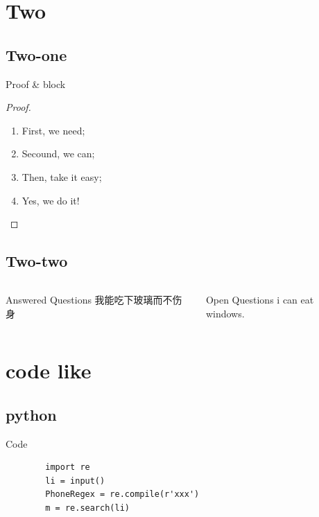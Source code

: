 \documentclass{ctexbeamer}
\begin{document}
  \section{Two}
    \subsection{Two-one}
    \begin{frame}{Proof & block}
      \begin{proof}
          \begin{enumerate}
              \item<1-> First, we need;
              \item<2-> Secound, we can;
              \item<3-> Then, take it easy;
              \item<1-> Yes, we do it!
          \end{enumerate}
      \end{proof}  
    \end{frame}
    
    \subsection{Two-two}
    \begin{frame}
        \begin{columns}[t]
            \begin{block}{Answered Questions}
                我能吃下玻璃而不伤身
            \end{block}
    
            \begin{block}{Open Questions}
                i can eat windows.
            \end{block}
        \end{columns}
    \end{frame}
  
  \section{code like}
  \subsection{python}
  \begin{frame}[fragile]{Code}
      \begin{lstlisting}
        import re
        li = input()
        PhoneRegex = re.compile(r'xxx')
        m = re.search(li)
      \end{lstlisting}
  \end{frame}
  
\end{document}
